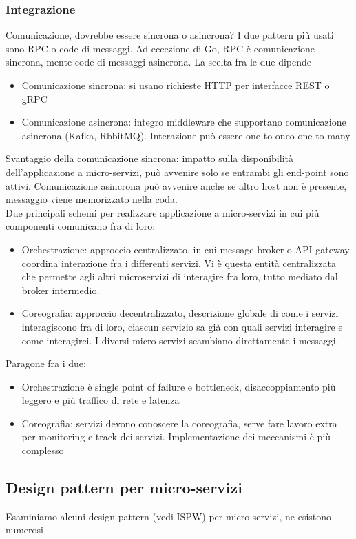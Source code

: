 \documentclass[16px]{article}
\begin{document}
\subsubsection{Integrazione}
Comunicazione, dovrebbe essere sincrona o asincrona? I due pattern più usati sono RPC o code di messaggi. Ad eccezione di Go, RPC è comunicazione sincrona,  mente code di messaggi asincrona. La scelta fra le due dipende
\begin{itemize}
\item Comunicazione sincrona: si usano richieste HTTP per interfacce REST o gRPC
\item Comunicazione asincrona: integro middleware che supportano comunicazione asincrona (Kafka, RbbitMQ). Interazione può essere one-to-oneo one-to-many
\end{itemize}
Svantaggio della comunicazione sincrona: impatto sulla disponibilità dell'applicazione a micro-servizi, può avvenire solo se entrambi gli end-point sono attivi. Comunicazione asincrona può avvenire anche se altro host non è presente, messaggio viene memorizzato nella coda.
\\ Due principali schemi per realizzare applicazione a micro-servizi in cui più componenti comunicano fra di loro:
\begin{itemize}
\item Orchestrazione: approccio centralizzato, in cui message broker o API gateway coordina interazione fra i differenti servizi. Vi è questa entità centralizzata che permette agli altri microservizi di interagire fra loro, tutto mediato dal broker intermedio.
\item Coreografia: approccio decentralizzato, descrizione globale di come i servizi interagiscono fra di loro, ciascun servizio sa già con quali servizi interagire e come interagirci. I diversi micro-servizi scambiano direttamente i messaggi.
\end{itemize}
Paragone fra i due:
\begin{itemize}
\item Orchestrazione è single point of failure e bottleneck, disaccoppiamento più leggero e più traffico di rete e latenza
\item Coreografia: servizi devono conoscere la coreografia, serve fare lavoro extra per monitoring e track dei servizi. Implementazione dei meccanismi è più complesso
\end{itemize}
\subsection{Design pattern per micro-servizi}
Esaminiamo alcuni design pattern (vedi ISPW) per micro-servizi, ne esistono numerosi
\end{document}
